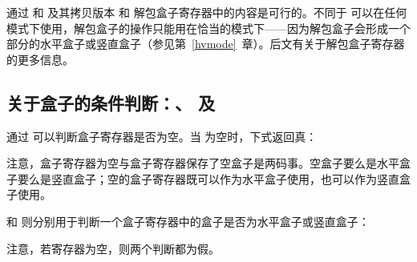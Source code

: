 \documentclass{book}
\begin{document}
通过  和  及其拷贝版本  和  解包盒子寄存器中的内容是可行的。不同于  可以在任何模式下使用，解包盒子的操作只能用在恰当的模式下——因为解包盒子会形成一个部分的水平盒子或竖直盒子（参见第~\ref{hvmode}~章）。后文有关于解包盒子寄存器的更多信息。

\subsection{关于盒子的条件判断：、 及 }

通过  可以判断盒子寄存器是否为空。当  为空时，下式返回真：
\begin{disp}\end{disp}
注意，盒子寄存器为空与盒子寄存器保存了空盒子是两码事。空盒子要么是水平盒子要么是竖直盒子；空的盒子寄存器既可以作为水平盒子使用，也可以作为竖直盒子使用。

 和  则分别用于判断一个盒子寄存器中的盒子是否为水平盒子或竖直盒子：
\begin{disp}\end{disp}
\begin{disp}\end{disp}
注意，若寄存器为空，则两个判断都为假。
\end{document}
